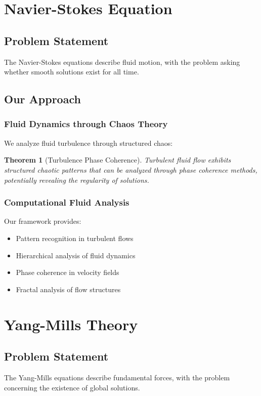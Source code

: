 \documentclass[12pt]{article}
\newtheorem{theorem}{Theorem}
\begin{document}
\section{Navier-Stokes Equation}

\subsection{Problem Statement}
The Navier-Stokes equations describe fluid motion, with the problem asking whether smooth solutions exist for all time.

\subsection{Our Approach}

\subsubsection{Fluid Dynamics through Chaos Theory}

We analyze fluid turbulence through structured chaos:

\begin{theorem}[Turbulence Phase Coherence]
Turbulent fluid flow exhibits structured chaotic patterns that can be analyzed through phase coherence methods, potentially revealing the regularity of solutions.
\end{theorem}

\subsubsection{Computational Fluid Analysis}

Our framework provides:
\begin{itemize}
    \item Pattern recognition in turbulent flows
    \item Hierarchical analysis of fluid dynamics
    \item Phase coherence in velocity fields
    \item Fractal analysis of flow structures
\end{itemize}

\section{Yang-Mills Theory}

\subsection{Problem Statement}
The Yang-Mills equations describe fundamental forces, with the problem concerning the existence of global solutions.
\end{document}
